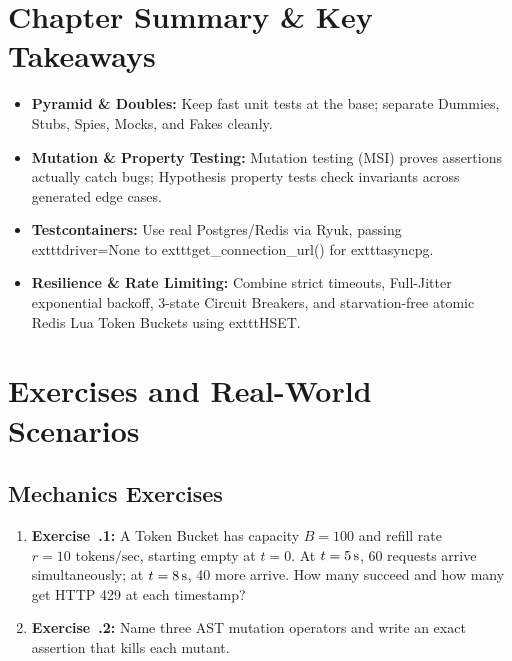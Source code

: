 \section{Chapter Summary \protect\& Key Takeaways}

\begin{itemize}[leftmargin=15pt]
  \item \textbf{Pyramid \& Doubles:} Keep fast unit tests at the base; separate Dummies, Stubs, Spies, Mocks, and Fakes cleanly.
  \item \textbf{Mutation \& Property Testing:} Mutation testing (MSI) proves assertions actually catch bugs; Hypothesis property tests check invariants across generated edge cases.
  \item \textbf{Testcontainers:} Use real Postgres/Redis via Ryuk, passing 	exttt{driver=None} to 	exttt{get\_connection\_url()} for 	exttt{asyncpg}.
  \item \textbf{Resilience \& Rate Limiting:} Combine strict timeouts, Full-Jitter exponential backoff, 3-state Circuit Breakers, and starvation-free atomic Redis Lua Token Buckets using 	exttt{HSET}.
\end{itemize}

\section{Exercises and Real-World Scenarios}

\subsection{Mechanics Exercises}
\begin{enumerate}[leftmargin=15pt]
  \item \textbf{Exercise~\thechapter.1:} A Token Bucket has capacity $B = 100$ and refill rate $r = 10\text{ tokens/sec}$, starting empty at $t = 0$. At $t = 5\text{\,s}$, 60 requests arrive simultaneously; at $t = 8\text{\,s}$, 40 more arrive. How many succeed and how many get HTTP 429 at each timestamp?
  \item \textbf{Exercise~\thechapter.2:} Name three AST mutation operators and write an exact assertion that kills each mutant.
\end{enumerate}

